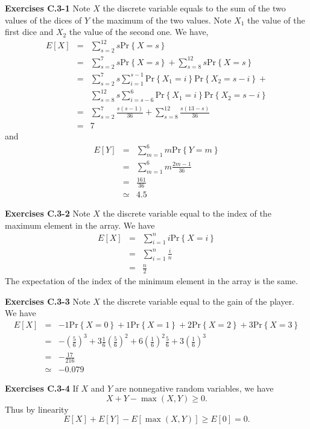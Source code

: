 \documentclass[a4paper,12pt]{article}
\newcommand{\newpar}[1]
{\bigskip \noindent \textbf{Exercises #1} \newline}
\newcommand{\prob}[1]{\mathrm{Pr}\left\{ #1 \right\}}
\begin{document}
 \newpar{C.3-1}
Note $X$ the discrete variable equals to the sum of the two values of
the dices of $Y$ the maximum of the two values.  Note $X_1$ the value
of the first dice and $X_2$ the value of the second one.  We have,
\begin{eqnarray*}
  E[X] &=& \sum_{s=2}^{12} s \prob{X=s} \\
  &=& \sum_{s=2}^7 s \prob{X=s} + \sum_{s=8}^{12} s \prob{X=s} \\
  &=& \sum_{s=2}^7 s \sum_{i=1}^{s-1} \prob{X_1 = i}\prob{X_2 = s-i} +
  \\ && \sum_{s=8}^{12} s \sum_{i=s-6}^6\prob{X_1 = i} \prob{X_2 =
    s-i} \\
  &=& \sum_{s=2}^7 \frac{s(s-1)}{36} + \sum_{s=8}^{12}
  \frac{s(13-s)}{36} \\
  &=& 7
\end{eqnarray*}
and
\begin{eqnarray*}
  E[Y] &=& \sum_{m=1}^6 m \prob{Y=m} \\
  &=& \sum_{m=1}^6 m \frac{2m-1}{36} \\
  &=& \frac{161}{36} \\
  &\simeq& 4.5
\end{eqnarray*}

\newpar{C.3-2}
Note $X$ the discrete variable equal to the index of the maximum
element in the array.  We have
\begin{eqnarray*}
  E[X] &=& \sum_{i=1}^n i \prob{X = i} \\
  &=& \sum_{i=1}^n \frac{i}{n} \\
  &=& \frac{n}{2}
\end{eqnarray*}
The expectation of the index of the minimum element in the array is
the same.

\newpar{C.3-3}
Note $X$ the discrete variable equal to the gain of the player.  We
have
\begin{eqnarray*}
  E[X] &=& -1 \prob{X = 0} + 1 \prob{X = 1} + 2 \prob{X = 2} +
  3 \prob{X = 3} \\
  &=& - \left(\frac{5}{6}\right)^3 + 3\frac{1}{6}
  \left(\frac{5}{6}\right)^2 +
  6 \left(\frac{1}{6}\right)^2 \frac{5}{6} +
  3 \left(\frac{1}{6}\right)^3 \\
  &=& -\frac{17}{216} \\
  &\simeq& - 0.079
\end{eqnarray*}

\newpar{C.3-4}
If $X$ and $Y$ are nonnegative random variables, we have
\[ X + Y - \max(X,Y) \ge 0.\]
Thus by linearity
\[ E[X] + E[Y] - E[\max(X,Y)] \ge E[0] = 0.\]
\end{document}
